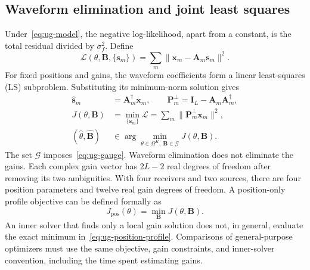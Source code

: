 \subsection{Waveform elimination and joint least squares}\label{sec:ug-ls}
Under~\eqref{eq:ug-model}, the negative log-likelihood, apart from a constant, is the total residual divided by $\sigma_f^2$. Define
\begin{equation}\label{eq:ug-full-ls}
\mathcal L(\theta,\mathbf B,\{\mathbf s_m\})
=\sum_m\|\mathbf x_m-\mathbf A_m\mathbf s_m\|^2.
\end{equation}
For fixed positions and gains, the waveform coefficients form a linear least-squares (LS) subproblem. Substituting its minimum-norm solution gives
\begin{equation}\label{eq:ug-profile}
\begin{aligned}
\widehat{\mathbf s}_m&=\mathbf A_m^\dagger\mathbf x_m,\qquad
\mathbf P_m^\perp=\mathbf I_L-\mathbf A_m\mathbf A_m^\dagger,\\
J(\theta,\mathbf B)&=\min_{\{\mathbf s_m\}}\mathcal L
=\sum_m\|\mathbf P_m^\perp\mathbf x_m\|^2,\\
(\widehat\theta,\widehat{\mathbf B})&\in
\arg\min_{\theta\in\Omega^K,\,\mathbf B\in\mathcal G}
J(\theta,\mathbf B).
\end{aligned}
\end{equation}
The set $\mathcal G$ imposes~\eqref{eq:ug-gauge}. Waveform elimination does not eliminate the gains. Each complex gain vector has $2L-2$ real degrees of freedom after removing its two ambiguities. With four receivers and two sources, there are four position parameters and twelve real gain degrees of freedom. A position-only profile objective can be defined formally as
\begin{equation}\label{eq:ug-position-profile}
J_{\mathrm{pos}}(\theta)=\min_{\mathbf B}J(\theta,\mathbf B).
\end{equation}
An inner solver that finds only a local gain solution does not, in general, evaluate the exact minimum in~\eqref{eq:ug-position-profile}. Comparisons of general-purpose optimizers must use the same objective, gain constraints, and inner-solver convention, including the time spent estimating gains.

